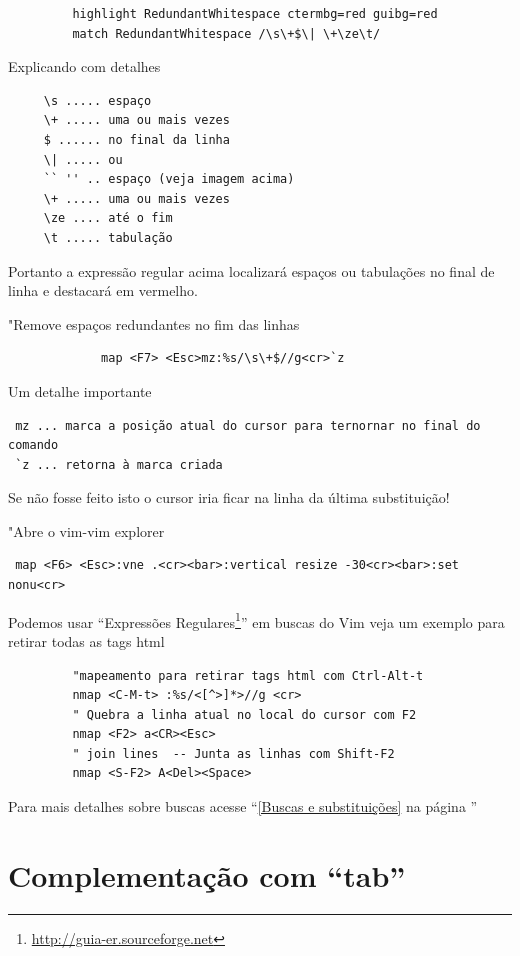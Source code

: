\documentclass[10pt,a4paper,openany]{book}
\begin{document}
\begin{verbatim}
		 highlight RedundantWhitespace ctermbg=red guibg=red
		 match RedundantWhitespace /\s\+$\| \+\ze\t/
\end{verbatim}

Explicando com detalhes

\begin{verbatim}
	 \s ..... espaço
	 \+ ..... uma ou mais vezes
	 $ ...... no final da linha
	 \| ..... ou
	 `` '' .. espaço (veja imagem acima)
	 \+ ..... uma ou mais vezes
	 \ze .... até o fim
	 \t ..... tabulação
\end{verbatim}

Portanto a expressão regular acima localizará espaços ou tabulações no final de linha
e destacará em vermelho.

"Remove espaços redundantes no fim das linhas

\begin{verbatim}
			 map <F7> <Esc>mz:%s/\s\+$//g<cr>`z
\end{verbatim}

Um detalhe importante

\begin{verbatim}
 mz ... marca a posição atual do cursor para ternornar no final do comando
 `z ... retorna à marca criada
\end{verbatim}

Se não fosse feito isto o cursor iria ficar na linha da última substituição!

"Abre o vim-vim explorer

\begin{verbatim}
 map <F6> <Esc>:vne .<cr><bar>:vertical resize -30<cr><bar>:set nonu<cr>
\end{verbatim}

Podemos usar ``Expressões Regulares\footnote{\url{http://guia-er.sourceforge.net}}'' em
buscas do Vim veja um exemplo para retirar todas as tags html

\begin{verbatim}
		 "mapeamento para retirar tags html com Ctrl-Alt-t
		 nmap <C-M-t> :%s/<[^>]*>//g <cr>
		 " Quebra a linha atual no local do cursor com F2
		 nmap <F2> a<CR><Esc>
		 " join lines  -- Junta as linhas com Shift-F2
		 nmap <S-F2> A<Del><Space>
\end{verbatim}

Para mais detalhes sobre buscas acesse ``\ref{Buscas e substituições}
na página \pageref{Buscas e substituições}''

\section{Complementação com ``tab''}\label{Complementação com ``tab''}
\end{document}
